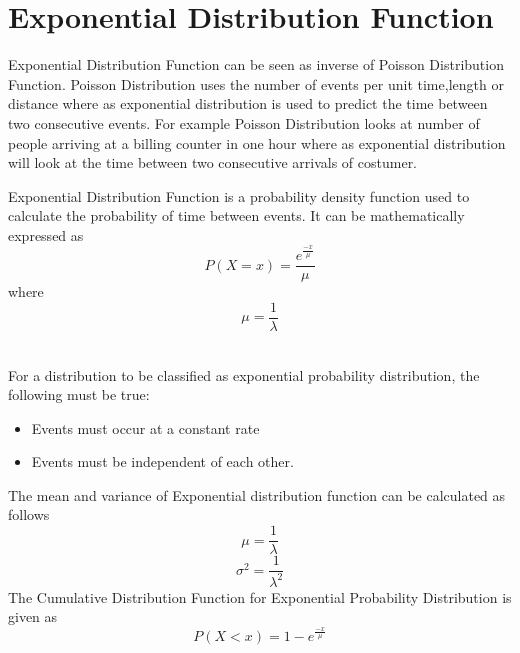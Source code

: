 \documentclass[twoside,12pt]{report}  %
\begin{document}
\section{Exponential Distribution Function}

Exponential Distribution Function can be seen as inverse of Poisson Distribution Function. Poisson Distribution uses the number of events per unit time,length or distance where as exponential distribution is used to predict the time between two consecutive events. For example Poisson Distribution looks at number of people arriving at a billing counter in one hour where as exponential distribution will look at  the time between two consecutive arrivals of costumer. 
\\
\begin{tcolorbox}[colback=red!5!white, colframe=red!75!black, title = \textbf{Exponential Probability Distribution}]
	Exponential Distribution Function is a probability density function used to calculate the probability of time between events. It can be mathematically expressed as
	$$ \boxed{P(X = x) = \frac{e^{\frac{-x}{\mu}}}{\mu}}$$
	where
	$$ \boxed{\mu = \frac{1}{\lambda}} $$
\end{tcolorbox}
\noindent
\\
For a distribution to be classified as exponential probability distribution, the following must be true:
\begin{itemize}
	\item Events must occur at a constant rate
	\item Events must be independent of each other.
\end{itemize}

\noindent
The mean and variance of Exponential distribution function can be calculated as follows
$$\boxed{\mu = \frac{1}{\lambda}} $$
$$\boxed{\sigma^2 = \frac{1}{\lambda^2}}$$
\noindent
The Cumulative Distribution Function for Exponential Probability Distribution is given as
$$\boxed{P(X < x) = 1 - e^{\frac{-x}{\mu}}} $$ 

\vfill
\pagebreak
\end{document}
